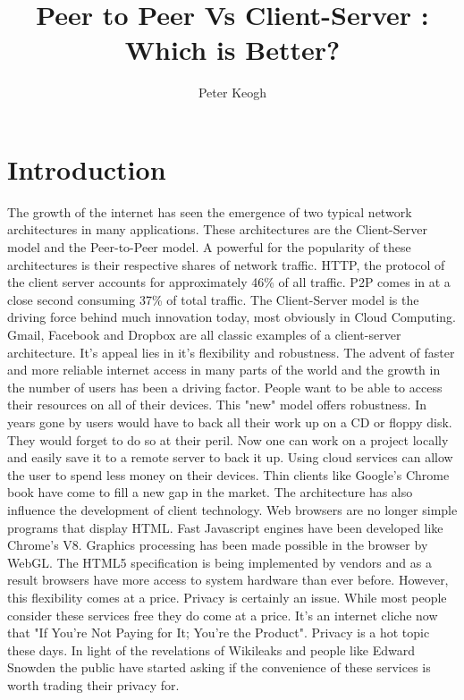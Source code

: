 \documentclass[12pt]{amsart}
\title{Peer to Peer Vs Client-Server : Which is Better?}
\author{Peter Keogh}
\date{}
\begin{document}
\maketitle
\tableofcontents

\section{Introduction}

The growth of the internet has seen the emergence of two typical network architectures in many applications. These architectures are the Client-Server model and the Peer-to-Peer model. A powerful for the popularity of these architectures is their respective shares of network traffic. HTTP, the protocol of the client server accounts for approximately 46\% of all traffic. P2P comes in at a close second consuming 37\% of total traffic.
The Client-Server model is the driving force behind much innovation today, most obviously in Cloud Computing. Gmail, Facebook and Dropbox are all classic examples of a client-server architecture. It's appeal lies in it's flexibility and robustness. The advent of faster and more reliable internet access in many parts of the world and the growth in the number of users has been a driving factor. People want to be able to access their resources on all of their devices. This "new" model offers robustness. In years gone by users would have to back all their work up on a CD or floppy disk. They would forget to do so at their peril. Now one can work on a project locally and easily save it to a remote server to back it up. 
Using cloud services can allow the user to spend less money on their devices. Thin clients like Google's Chrome book have come to fill a new gap in the market. 
The architecture has also influence the development of client technology. Web browsers are no longer simple programs that display HTML. Fast Javascript engines have been developed like Chrome's V8. Graphics processing has been made possible in the browser by WebGL. The HTML5 specification is being implemented by vendors and as a result browsers have more access to system hardware than ever before.
However, this flexibility comes at a price. Privacy is certainly an issue. While most people consider these services free they do come at a price. It's an internet cliche now that "If You're Not Paying for It; You're the Product". Privacy is a hot topic these days. In light of the revelations of Wikileaks and people like Edward Snowden the public have started asking if the convenience of these services is worth trading their privacy for. 
\end{document}
